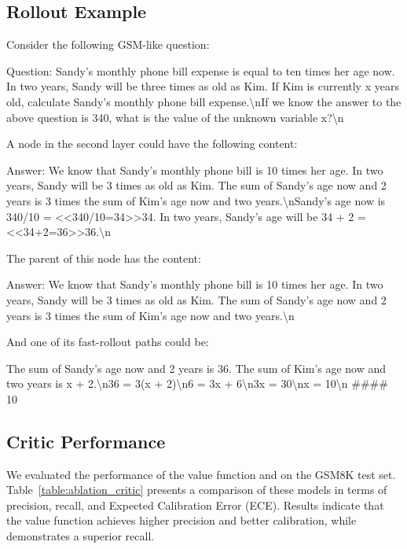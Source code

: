 \subsection{Rollout Example}
\label{app:rollout_example}
Consider the following GSM-like question:
\begin{tcolorbox}
Question: Sandy's monthly phone bill expense is equal to ten times her age now. In two years, Sandy will be three times as old as Kim. If Kim is currently x years old, calculate Sandy's monthly phone bill expense.\textbackslash nIf we know the answer to the above question is 340, what is the value of the unknown variable x?\textbackslash n 
\end{tcolorbox}
A node in the second layer could have the following content:
\begin{tcolorbox}
Answer: We know that Sandy's monthly phone bill is 10 times her age. In two years, Sandy will be 3 times as old as Kim. The sum of Sandy's age now and 2 years is 3 times the sum of Kim's age now and two years.\textbackslash nSandy's age now is 340/10 = <<340/10=34>>34. In two years, Sandy's age will be 34 + 2 = <<34+2=36>>36.\textbackslash n
\end{tcolorbox}
The parent of this node has the content:
\begin{tcolorbox}
Answer: We know that Sandy's monthly phone bill is 10 times her age. In two years, Sandy will be 3 times as old as Kim. The sum of Sandy's age now and 2 years is 3 times the sum of Kim's age now and two years.\textbackslash n
\end{tcolorbox}
And one of its fast-rollout paths could be:
\begin{tcolorbox}
The sum of Sandy's age now and 2 years is 36. The sum of Kim's age now and two years is x + 2.\textbackslash n36 = 3(x + 2)\textbackslash n6 = 3x + 6\textbackslash n3x = 30\textbackslash nx = 10\textbackslash n \#\#\#\# 10
\end{tcolorbox}

\subsection{Critic Performance}
\label{app:critic_performance}

We evaluated the performance of the value function and \prm{} on the GSM8K test set. Table~\ref{table:ablation_critic} presents a comparison of these models in terms of precision, recall, and Expected Calibration Error (ECE). Results indicate that the value function achieves higher precision and better calibration, while \prm{} demonstrates a superior recall.

